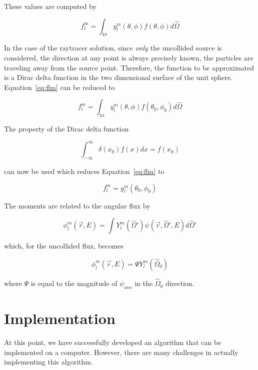 \documentclass{article}
\numberwithin{equation}{subsection}
\begin{document}
These values are computed by

\begin{equation}\label{eq:flm}
f_l^m = \int_{4 \pi} y_l^m(\theta, \phi) f(\theta, \phi) d\hat{\Omega}
\end{equation}

In the case of the raytracer solution, since \textit{only} the uncollided source is considered, the direction at any point is always precisely known, the particles are traveling away from the source point. Therefore, the function to be approximated is a Dirac delta function in the two dimensional surface of the unit sphere. Equation~\ref{eq:flm} can be reduced to

\begin{equation}
f_l^m = \int_{4 \pi} y_l^m(\theta, \phi)f(\theta_0, \phi_0) d\hat{\Omega}
\end{equation}

The property of the Dirac delta function 

\begin{equation}
\int_{-\infty}^{\infty} \delta(x_0) f(x) dx = f(x_0)
\end{equation}

can now be used which reduces Equation~\ref{eq:flm} to

\begin{equation}
f_l^m = y_l^m(\theta_0, \phi_0)
\end{equation}

The moments are related to the angular flux by

\begin{equation}
\phi_l^m(\vec{r}, E) = \int Y_l^m(\hat{\Omega} ') \psi(\vec{r}, \hat{\Omega}', E) d\hat{\Omega}'
\end{equation}

which, for the uncollided flux, becomes

\begin{equation}
\phi_l^m(\vec{r}, E) = \Psi Y_l^m(\hat{\Omega}_0)
\end{equation}

where $\Psi$ is equal to the magnitude of $\psi_{unc}$ in the $\hat{\Omega}_0$ direction.

\section{Implementation}
At this point, we have successfully developed an algorithm that can be implemented on a computer. However, there are many challenges in actually implementing this algorithm.
\end{document}
